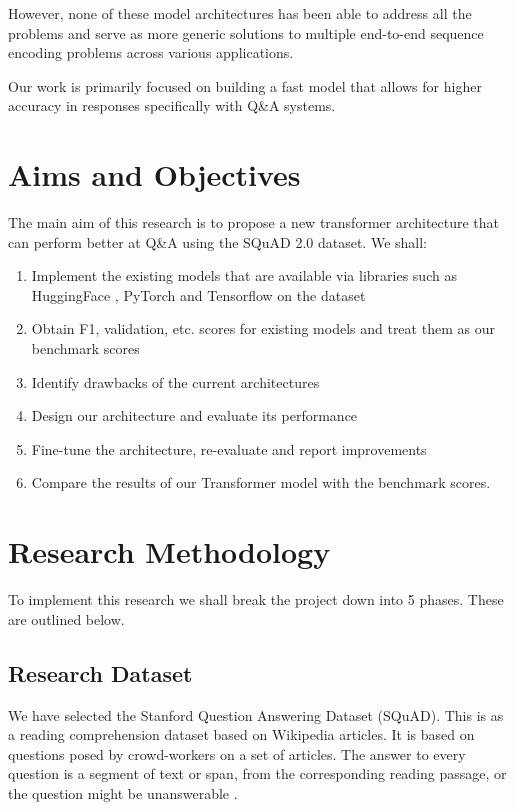 \documentclass[12pt]{report}
\begin{document}
\begin{appendices}
        However, none of these model architectures has been able to address all the problems and serve as more generic solutions to multiple end-to-end sequence encoding problems across various applications.

        Our work is primarily focused on building a fast model that allows for higher accuracy in responses specifically with Q\&A systems.

        \section{Aims and Objectives}\label{aims}

        The main aim of this research is to propose a new transformer architecture that can perform better at Q\&A using the SQuAD 2.0 dataset.
        We shall:
        \begin{enumerate}
            \item Implement the existing models that are available via libraries such as HuggingFace \citep{hfTransformers}, PyTorch and Tensorflow on the dataset
            \item Obtain F1, validation, etc. scores for existing models and treat them as our benchmark scores
            \item Identify drawbacks of the current architectures
            \item Design our architecture and evaluate its performance
            \item Fine-tune the architecture, re-evaluate and report improvements
            \item Compare the results of our Transformer model with the benchmark scores.
        \end{enumerate}

        \section{Research Methodology}\label{researchMeth}

        To implement this research we shall break the project down into 5 phases. These are outlined below.
        \subsection{Research Dataset}\label{datas}

        We have selected the Stanford Question Answering Dataset (SQuAD). This is as a reading comprehension dataset based on Wikipedia articles. It is based on questions posed by crowd-workers on a set of articles. The answer to every question is a segment of text or span, from the corresponding reading passage, or the question might be unanswerable \citep{dataset}.


\end{appendices}
\end{document}
